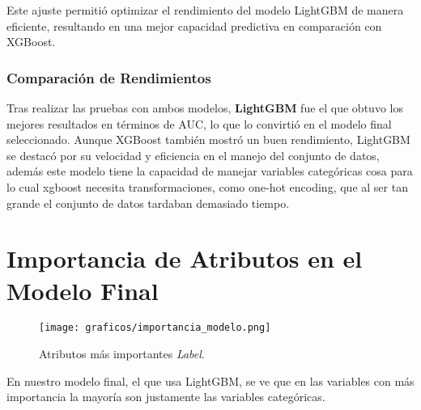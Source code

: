 \documentclass[a4paper,12pt]{article}
\begin{document}
Este ajuste permitió optimizar el rendimiento del modelo LightGBM de manera eficiente, resultando en una mejor capacidad predictiva en comparación con XGBoost.

\subsubsection{Comparación de Rendimientos}

Tras realizar las pruebas con ambos modelos, \textbf{LightGBM} fue el que obtuvo los mejores resultados en términos de AUC, lo que lo convirtió en el modelo final seleccionado. Aunque XGBoost también mostró un buen rendimiento, LightGBM se destacó por su velocidad y eficiencia en el manejo del conjunto de datos, además este modelo tiene la capacidad de manejar variables categóricas cosa para lo cual xgboost necesita transformaciones, como one-hot encoding, que al ser tan grande el conjunto de datos tardaban demasiado tiempo. 

\section{Importancia de Atributos en el Modelo Final}
    
\begin{figure}[H]
    \centering
    \texttt{[image: graficos/importancia\_modelo.png]}
    \caption{Atributos más importantes \textit{Label}.}
\end{figure}

En nuestro modelo final, el que usa LightGBM, se ve que en las variables con más importancia la mayoría son justamente las variables categóricas.
\end{document}

